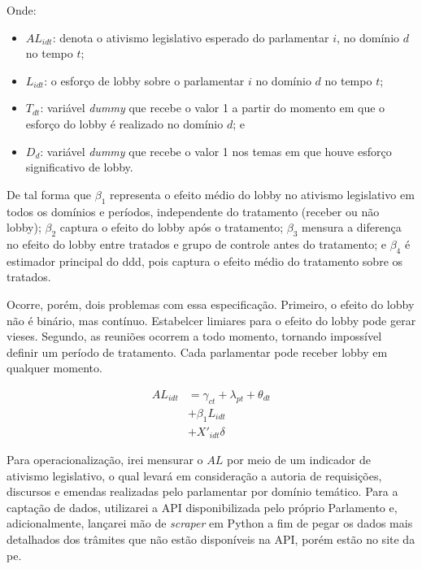 Onde:
\begin{itemize}
    \item $AL_{idt}$: denota o ativismo legislativo esperado do parlamentar $i$, no domínio $d$ no tempo $t$;
    \item $L_{idt}$: o esforço de lobby sobre o parlamentar $i$ no domínio $d$ no tempo $t$;
    \item $T_{dt}$: variável \textit{dummy} que recebe o valor 1 a partir do momento em que o esforço do lobby é realizado no domínio $d$; e
    \item $D_d$: variável \textit{dummy} que recebe o valor 1 nos temas em que houve esforço significativo de lobby.
\end{itemize}

De tal forma que $\beta_1$ representa o efeito médio do lobby no ativismo legislativo em todos os domínios e períodos, independente do tratamento (receber ou não lobby); $\beta_2$ captura o efeito do lobby após o tratamento; $\beta_3$ mensura a diferença no efeito do lobby entre tratados e grupo de controle antes do tratamento; e $\beta_4$ é estimador principal do \acrshort{ddd}, pois captura o efeito médio do tratamento sobre os tratados.

Ocorre, porém, dois problemas com essa especificação. Primeiro, o efeito do lobby não é binário, mas contínuo. Estabelcer limiares para o efeito do lobby pode gerar vieses. Segundo, as reuniões ocorrem a todo momento, tornando impossível definir um período de tratamento. Cada parlamentar pode receber lobby em qualquer momento.  %


\begin{equation}
    \begin{split}
        AL_{idt} &= \gamma_{ct} + \lambda_{pt} + \theta_{dt}\\
        &+ \beta_1 L_{idt}\\
        &+ X'_{idt} \delta
    \end{split}
\end{equation}






Para operacionalização, irei mensurar o $AL$ por meio de um indicador de ativismo legislativo, o qual levará em consideração a autoria de requisições, discursos e emendas realizadas pelo parlamentar por domínio temático. Para a captação de dados, utilizarei a API disponibilizada pelo próprio Parlamento e, adicionalmente, lançarei mão de \textit{scraper} em Python a fim de pegar os dados mais detalhados dos trâmites que não estão disponíveis na API, porém estão no site da \acrshort{pe}.

